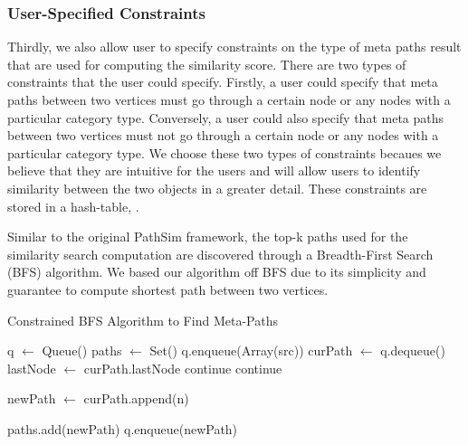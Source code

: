 \subsubsection{User-Specified Constraints}
\label{sec:user_constraint}

Thirdly, we also allow user to specify constraints on the type of meta paths
result that are used for computing the similarity score. There are two types of
constraints that the user could specify. Firstly, a user could specify that
meta paths between two vertices must go through a certain node or any nodes
with a particular category type. Conversely,  a user could also specify that
meta paths between two vertices must not go through a certain node or any nodes
with a particular category type. We choose these two types of constraints
becaues we believe that they are intuitive for the users and will allow users
to identify similarity between the two objects in a greater detail. These
constraints are stored in a hash-table, \cTable.

Similar to the original PathSim framework, the top-k paths used for the
similarity search computation are discovered through a Breadth-First Search
(BFS) algorithm. We based our algorithm off BFS due to its simplicity and guarantee to
compute shortest path between two vertices.

\begin{algorithm}
    \caption{Constrained BFS Algorithm to Find Meta-Paths}
    \label{alg:1}
    \begin{algorithmic}[1]
            \State q $\gets$ Queue()
            \State paths $\gets$ Set()
            \State q.enqueue(Array(src))
            \State
                \State curPath $\gets$ q.dequeue()
                \State lastNode $\gets$ curPath.lastNode
                        \State continue
                        \State continue
                    \EndIf
                    \State

                    \State newPath $\gets$ curPath.append(n)

                            \State paths.add(newPath)
                        \EndIf
                    \Else
                        \State q.enqueue(newPath)
                    \EndIf
                \EndFor
            \EndWhile
            \State
            \State {}
        \EndFunction
    \end{algorithmic}
\end{algorithm}

